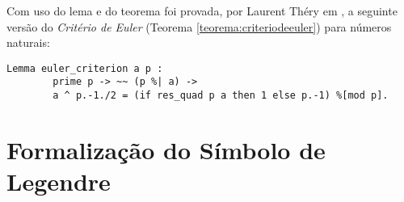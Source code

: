 \begin{enumerate}[label=\textbf{\roman*.}]
\begin{enumerate}[label=\textbf{\roman{enumi}.(\alph*)}]
        \end{enumerate}



\end{enumerate}

        Com uso do lema  e do teorema  foi provada, por Laurent Théry em \cite{mathcomp-extra-euler}, a seguinte versão do \textit{Critério de Euler} (Teorema \ref{teorema:criteriodeeuler}) para números naturais:
                \begin{lstlisting}[language=coq,frame=single,tabsize=1]
Lemma euler_criterion a p : 
        prime p -> ~~ (p %| a) -> 
        a ^ p.-1./2 = (if res_quad p a then 1 else p.-1) %[mod p].
                \end{lstlisting}


\section{Formalização do Símbolo de Legendre}
\label{sec:form-legendre}

